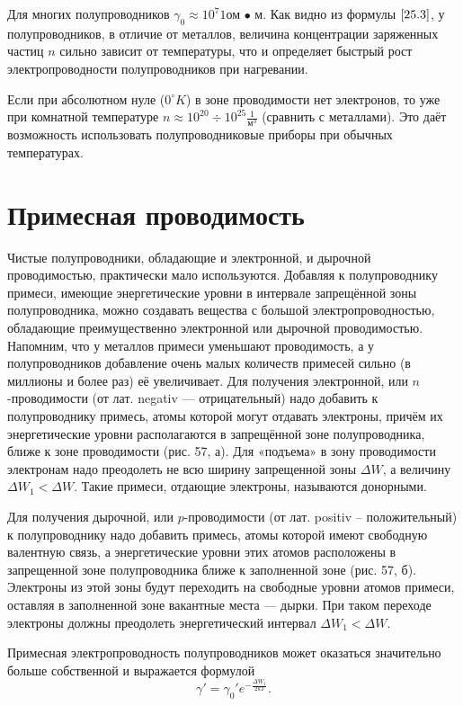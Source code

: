 \documentclass[a4paper,10pt]{book}
\begin{document}
Для многих полупроводников $\gamma_0 \approx 10^7 1\text{ом • м}$. Как видно из формулы $\ref{25.3}$, у полупроводников, в отличие от металлов, величина концентрации заряженных частиц $n$ сильно зависит от температуры, что и определяет быстрый рост электропроводности полупроводников при нагревании.

Если при абсолютном нуле ($0^\circ K$) в зоне проводимости нет электронов, то уже при комнатной температуре $n \approx 10^{20} \div 10^{25}\frac{1}{\textit{м}^3}$ (сравнить с металлами). Это даёт возможность использовать полупроводниковые приборы при обычных температурах.

\section{Примесная проводимость}

Чистые полупроводники, обладающие и электронной, и дырочной проводимостью, практически мало используются. Добавляя к полупроводнику примеси, имеющие энергетические уровни в интервале запрещённой зоны полупроводника, можно создавать вещества с большой электропроводностью, обладающие преимущественно электронной или дырочной проводимостью. Напомним, что у металлов примеси уменьшают проводимость, а у полупроводников добавление очень малых количеств примесей сильно (в миллионы и более раз) её увеличивает. Для получения электронной, или $n$-проводимости (от лат. negativ — отрицательный) надо добавить к полупроводнику примесь, атомы которой могут отдавать электроны, причём их энергетические уровни располагаются в запрещённой зоне полупроводника, ближе к зоне проводимости (рис. 57, $\textit{а}$). Для «подъема» в зону проводимости электронам надо преодолеть не всю ширину запрещенной зоны $\Delta W$, а величину $\Delta W_1 < \Delta W$. Такие примеси, отдающие электроны, называются донорными.

Для получения дырочной, или $p$-проводимости (от лат. positiv -- положительный) к полупроводнику надо добавить примесь, атомы которой имеют свободную валентную связь, а энергетические уровни этих атомов расположены в запрещенной зоне полупроводника ближе к заполненной зоне (рис. 57, $\textit{б}$). Электроны из этой зоны будут переходить на свободные уровни атомов примеси, оставляя в заполненной зоне вакантные места — дырки. При таком переходе электроны должны преодолеть энергетический интервал $\Delta W_1 < \Delta W$.

Примесная электропроводность полупроводников может оказаться значительно больше собственной и выражается формулой\begin{equation}\label{26.4}
\gamma' = \gamma_0' e^{-\frac{\Delta W_1}{2kT}}.
\end{equation}
\end{document}
